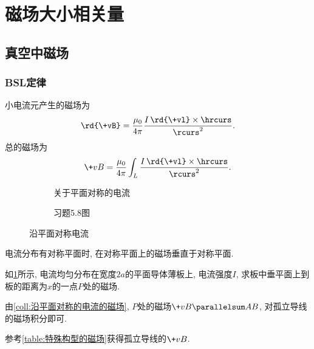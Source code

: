 \documentclass[hidelinks]{ctexart}
\begin{document}

\section{磁场大小相关量} %
\label{sec:磁场大小相关量}

\subsection{真空中磁场} %
\label{sub:真空中磁场}

\subsubsection{BSL定律} %
\label{ssub:bsl定律}

\begin{finale}
    \begin{theorem}
        [BSL定律]
        小电流元产生的磁场为
        \[ \rd{\+vB} = \frac{\mu_0}{4\pi} \frac{I \,\rd{\+vl}\times{\hrcurs}}{\rcurs^2}. \]
        总的磁场为
        \[ \+vB = \frac{\mu_0}{4\pi}\int_L \frac{I\,\rd{\+vl}\times\hrcurs}{\rcurs^2}. \]
    \end{theorem}
\end{finale}
\begin{figure}[ht]
    \centering
    \begin{subfigure}[b]{.45\textwidth}
        \centering
        \caption{关于平面对称的电流}
    \end{subfigure}
    \begin{subfigure}[b]{.45\textwidth}
        \centering
        \caption{习题5.8图}
        \label{fig:习题5.8图}
    \end{subfigure}
    \caption{沿平面对称电流}
    \label{fig:沿平面对称电流}
\end{figure}
\begin{corollary}
    \label{coll:沿平面对称的电流的磁场}
    电流分布有对称平面时, 在对称平面上的磁场垂直于对称平面.
\end{corollary}
\begin{sample}
    \begin{ex}[习题5.8]
        如\cref{fig:习题5.8图}所示, 电流均匀分布在宽度$2a$的平面导体薄板上, 电流强度$I$, 求板中垂平面上到板的距离为$x$的一点$P$处的磁场.
    \end{ex}
    \begin{solution}
        由\cref{coll:沿平面对称的电流的磁场}, $P$处的磁场$\+vB\parallelsum AB$, 对孤立导线的磁场积分即可.
    \end{solution}
    \begin{hardlink}
        参考\cref{table:特殊构型的磁场}获得孤立导线的$\+vB$.
    \end{hardlink}
\end{sample}
\end{document}
